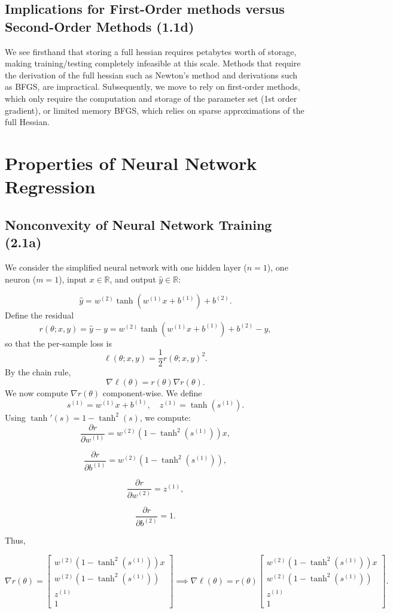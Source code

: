 \documentclass[11pt]{article}
\newcommand{\R}{\mathbb{R}}
\begin{document}
\subsection*{Implications for First-Order methods versus Second-Order Methods (1.1d)} 
We see firsthand that storing a full hessian requires petabytes worth of storage, making training/testing completely infeasible at this scale. Methods that require the derivation of the full hessian such as Newton's method and derivations such as BFGS, are impractical. Subsequently, we move to rely on first-order methods, which only require the computation and storage of the parameter set (1st order gradient), or limited memory BFGS, which relies on sparse approximations of the full Hessian. 
\newpage
\section*{Properties of Neural Network Regression}
\subsection*{Nonconvexity of Neural Network Training (2.1a)}

We consider the simplified neural network with one hidden layer ($n=1$), one neuron ($m=1$), input $x \in \R$, and output $\hat{y} \in \R$:

\[
\hat{y} = w^{(2)} \tanh(w^{(1)}x + b^{(1)}) + b^{(2)}.
\]
Define the residual
\[
r(\theta;x,y) = \hat{y} - y
= w^{(2)}\tanh(w^{(1)}x + b^{(1)}) + b^{(2)} - y,
\]
so that the per-sample loss is
\[
\ell(\theta;x,y) = \frac{1}{2} r(\theta;x,y)^2.
\]
By the chain rule,
\[
\nabla \ell(\theta) = r(\theta)\nabla r(\theta).
\]
We now compute $\nabla r(\theta)$ component-wise. We define
\[
s^{(1)} = w^{(1)}x + b^{(1)}, 
\quad
z^{(1)} = \tanh(s^{(1)}).
\]
Using $\tanh'(s)=1-\tanh^2(s)$, we compute:
\[
\frac{\partial r}{\partial w^{(1)}}
=
w^{(2)} (1-\tanh^2(s^{(1)})) x,
\]

\[
\frac{\partial r}{\partial b^{(1)}}
=
w^{(2)} (1-\tanh^2(s^{(1)})),
\]

\[
\frac{\partial r}{\partial w^{(2)}}
=
z^{(1)},
\]

\[
\frac{\partial r}{\partial b^{(2)}}
=
1.
\]

Thus,

\[
\nabla r(\theta)
=
\begin{bmatrix}
w^{(2)}(1-\tanh^2(s^{(1)}))x \\
w^{(2)}(1-\tanh^2(s^{(1)})) \\
z^{(1)} \\
1
\end{bmatrix} \implies 
\nabla \ell(\theta)
=
r(\theta)
\begin{bmatrix}
w^{(2)}(1-\tanh^2(s^{(1)}))x \\
w^{(2)}(1-\tanh^2(s^{(1)})) \\
z^{(1)} \\
1
\end{bmatrix}.
\]
\end{document}
